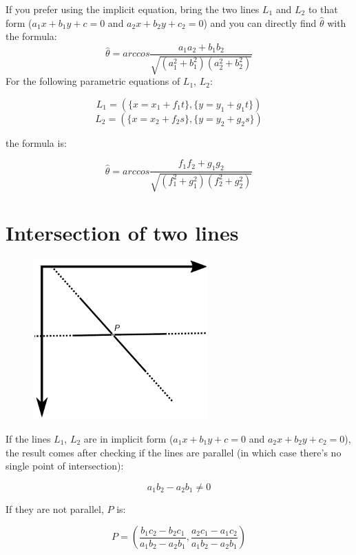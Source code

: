 \documentclass[12pt,openany,a4,usenames,dvipsnames]{book}
\begin{document}
If you prefer using the implicit equation, bring the two lines $L_1$ and $L_2$ to that form ($a_1x+b_1y+c=0$ and $a_2x+b_2y+c_2=0$) and you can directly find $\hat{θ}$ with the formula:
$$\hat{θ} = arccos\frac{a_{1}a_{2}+b_{1}b_{2}}{\sqrt{(a_1^2 + b_1^2)(a_2^2+b_2^2)}}$$
For the following parametric equations of $L_1$, $L_2$:

$$ L_{1} = (\{x=x_1 +f_1t\}, \{y=y_1+g_1t\})$$
$$ L_{2} = (\{x=x_2 +f_2s\}, \{y=y_2+g_2s\})$$

the formula is:

$$\hat{θ} = arccos\frac{f_{1}f_{2}+g_{1}g_{2}}{\sqrt{(f_1^2 + g_1^2)(f_2^2+g_2^2)}}$$

\chapter{Intersection of two lines}\label{ch:intersection-lines}
\begin{figure}[H]
\centering
\includegraphics[width=0.6\textwidth,keepaspectratio]{figures/intersection_lines.pdf}
\end{figure}
If the lines $L_1$, $L_2$ are in implicit form ($a_1x+b_1y+c=0$ and $a_2x+b_2y+c_2=0$), the result comes after checking if the lines are parallel (in which case there's no single point of intersection):

$$a_1b_2-a_2b_1 \neq{} 0$$

If they are not parallel, $P$ is:

$$P = (\frac{b_1c_2-b_2c_1}{a_1b_2-a_2b_1}, \frac{a_2c_1-a_1c_2}{a_1b_2-a_2b_1})$$
\end{document}
